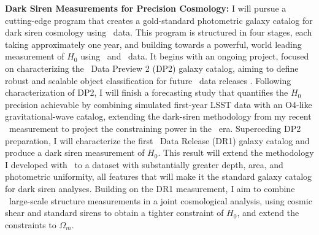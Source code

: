 \textbf{Dark Siren Measurements for Precision Cosmology:}
I will pursue a cutting-edge program that creates a gold-standard photometric galaxy catalog for dark siren cosmology using \LSST\ data.
This program is structured in four stages, each taking approximately one year, and building towards a powerful, world leading measurement of $H_0$ using \GW\ and \EM\ data.
It begins with an ongoing project, focused on characterizing the \LSST\ Data Preview 2 (DP2) galaxy catalog, aiming to define robust and scalable object classification for future \LSST\ data releases%
.
Following characterization of DP2, I will finish a forecasting study that quantifies the $H_0$ precision achievable by combining simulated first-year LSST data with an O4-like gravitational-wave catalog, extending the dark-siren methodology from my recent \DELVE\ measurement \citep{MacBride2026DELVEH0} to project the constraining power in the \LSST\ era.
Superceding DP2 preparation, I will characterize the first \LSST\ Data Release (DR1) galaxy catalog and produce a dark siren measurement of $H_0$. This result will extend the methodology I developed with \DELVE\ to a dataset with substantially greater depth, area, and photometric uniformity, all features that will make it the standard galaxy catalog for dark siren analyses.
Building on the DR1 measurement, I aim to combine \LSST\ large-scale structure measurements in a joint cosmological analysis, using cosmic shear and standard sirens to obtain a tighter constraint of $H_0$, and extend the constraints to $\Omega_m$.

